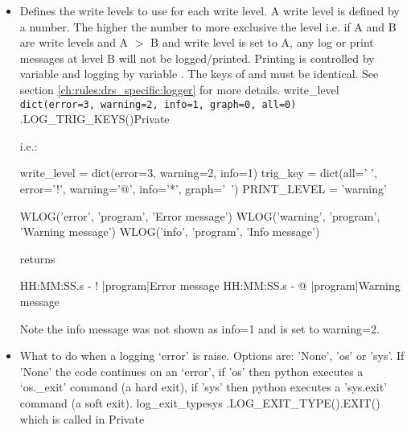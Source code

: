 \begin{itemize}
\ifdevguide

\item {}
\begin{minipage}[t]{\textwidth}
{Defines the write levels to use for each write level. A write level is defined by a number. The higher the number to more exclusive the level i.e. if A and B are write levels and A $>$ B and write level is set to A, any log or print messages at level B will not be logged/printed. Printing is controlled by variable  and logging by variable . The keys of  and  must be identical. See section \ref{ch:rules:drs_specific:logger} for more details.}
{write\_level}
{\lstinline[style=pythoninline]| dict(error=3, warning=2, info=1, graph=0, all=0) |}
{\AllRecipes}{\spirouConst.LOG\_TRIG\_KEYS()}{\AllRecipes}{Private}
\vspace{-0.25cm}
\begin{thighlight}
i.e.: 
\begin{pythonbox}
write_level = dict(error=3, warning=2, info=1)
trig_key = dict(all=' ', error='!', warning='@', info='*', graph='~')
PRINT_LEVEL = 'warning'

WLOG('error', 'program', 'Error message')
WLOG('warning', 'program', 'Warning message')
WLOG('info', 'program', 'Info message')
\end{pythonbox}
returns
\begin{cmdboxprint}
HH:MM:SS.s - ! |program|Error message
HH:MM:SS.s - @ |program|Warning message
\end{cmdboxprint}
\begin{note}
Note the info message was not shown as info=1 and  is set to warning=2.
\end{note}
\end{thighlight}
\end{minipage}
\fi


\ifdevguide
\item {} 
{What to do when a logging `error' is raise. Options are: 'None', 'os' or 'sys'. If 'None' the code continues on an `error', if 'os' then python executes a `os.\_exit' command (a hard exit), if 'sys' then python executes a 'sys.exit' command (a soft exit).}
{log\_exit\_type}{sys}
{\AllRecipes}{\spirouConst.LOG\_EXIT\_TYPE()}{\spirouConst.EXIT() which is called in \spirouLog}{Private}
\fi


\end{itemize}
